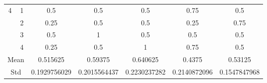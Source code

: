 \documentclass[draft,dvipsnames]{drexel-thesis}
\begin{document}
\begin{thesis}
\begin{table}[!t]
\begin{tabular}{|c|c|c|c|c|c|c|}
\multirow{4}{*}{4}    & 1                   & 0.5          & 0.5          & 0.5          & 0.75         & 0.5          \\ \cline{2-7} 
                      & 2                   & 0.25         & 0.5          & 0.5          & 0.25         & 0.75         \\ \cline{2-7} 
                      & 3                   & 0.5          & 1            & 0.5          & 0.5          & 0.5          \\ \cline{2-7} 
                      & 4                   & 0.25         & 0.5          & 1            & 0.75         & 0.5          \\ \hline
\multicolumn{2}{|c|}{Mean}                  & 0.515625     & 0.59375      & 0.640625     & 0.4375       & 0.53125      \\ \hline
\multicolumn{2}{|c|}{Std}                   & 0.1929756029 & 0.2015564437 & 0.2230237282 & 0.2140872096 & 0.1547847968 \\ \hline
\end{tabular}
\end{table}


\end{thesis}
\end{document}
